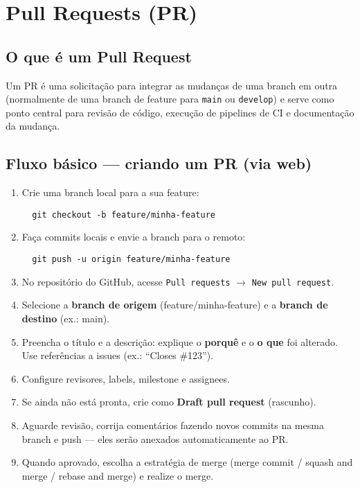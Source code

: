 \section{Pull Requests (PR)}

\subsection{O que é um Pull Request}
Um PR é uma solicitação para integrar as mudanças de uma branch em outra (normalmente de uma branch de feature para \texttt{main} ou \texttt{develop}) e serve como ponto central para revisão de código, execução de pipelines de CI e documentação da mudança.

\subsection{Fluxo básico — criando um PR (via web)}
\begin{enumerate}
  \item Crie uma branch local para a sua feature:
  \begin{verbatim}
  git checkout -b feature/minha-feature
  \end{verbatim}
  \item Faça commits locais e envie a branch para o remoto:
  \begin{verbatim}
  git push -u origin feature/minha-feature
  \end{verbatim}
  \item No repositório do GitHub, acesse \texttt{Pull requests} \(\rightarrow\) \texttt{New pull request}.
  \item Selecione a \textbf{branch de origem} (feature/minha-feature) e a \textbf{branch de destino} (ex.: main).
  \item Preencha o título e a descrição: explique o \textbf{porquê} e o \textbf{o que} foi alterado. Use referências a issues (ex.: ``Closes \#123'').
  \item Configure revisores, labels, milestone e assignees.
  \item Se ainda não está pronta, crie como \textbf{Draft pull request} (rascunho).
  \item Aguarde revisão, corrija comentários fazendo novos commits na mesma branch e push — eles serão anexados automaticamente ao PR.
  \item Quando aprovado, escolha a estratégia de merge (merge commit / squash and merge / rebase and merge) e realize o merge.
\end{enumerate}


